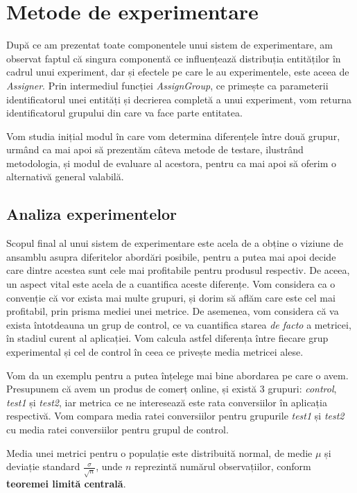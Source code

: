 \chapter{Metode de experimentare}

După ce am prezentat toate componentele unui sistem de experimentare, am observat faptul că singura componentă ce influențează distribuția entităților în cadrul unui experiment, dar și efectele pe care le au experimentele, este aceea de \textit{Assigner}. Prin intermediul funcției \textit{AssignGroup}, ce primește ca parameterii identificatorul unei entități și decrierea completă a unui experiment, vom returna identificatorul grupului din care va face parte entitatea. 

Vom studia inițial modul în care vom determina diferențele între două grupur, urmând ca mai apoi să prezentăm câteva metode de testare, ilustrând metodologia, și modul de evaluare al acestora, pentru ca mai apoi să oferim o alternativă general valabilă.

\section{Analiza experimentelor}

Scopul final al unui sistem de experimentare este acela de a obține o viziune de ansamblu asupra diferitelor abordări posibile, pentru a putea mai apoi decide care dintre acestea sunt cele mai profitabile pentru produsul respectiv. De aceea, un aspect vital este acela de a cuantifica aceste diferențe. Vom considera ca o convenție că vor exista mai multe grupuri, și dorim să aflăm care este cel mai profitabil, prin prisma mediei unei metrice. De asemenea, vom considera că va exista întotdeauna un grup de control, ce va cuantifica starea \textit{de facto} a metricei, în stadiul curent al aplicației. Vom calcula astfel diferența între fiecare grup experimental și cel de control în ceea ce privește media metricei alese.

Vom da un exemplu pentru a putea înțelege mai bine abordarea pe care o avem. Presupunem că avem un produs de comerț online, și există 3 grupuri: \textit{control}, \textit{test1} și \textit{test2}, iar metrica ce ne interesează este rata conversiilor în aplicația respectivă. Vom compara media ratei conversiilor pentru grupurile \textit{test1} și \textit{test2} cu media ratei conversiilor pentru grupul de control.

\begin{remark}
	Media unei metrici pentru o populație este distribuită normal, de medie ${\mu}$ și deviație standard $\frac{\sigma}{\sqrt{n}}$, unde $n$ reprezintă numărul observațiilor, conform \textbf{teoremei limită centrală}.
\end{remark}

